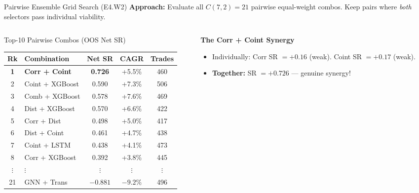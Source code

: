 \documentclass[aspectratio=169,10pt]{beamer}
\begin{document}
\begin{frame}{Pairwise Ensemble Grid Search (E4.W2)}
  \small\textbf{Approach:} Evaluate all $C(7,2)=21$ pairwise equal-weight combos. Keep pairs where \emph{both} selectors pass individual viability.
  \vspace{4pt}
  \begin{columns}[T]
    \begin{column}{0.52\textwidth}
      \begin{block}{Top-10 Pairwise Combos (OOS Net SR)}
        \centering\scriptsize\renewcommand{\arraystretch}{1.25}
        \begin{tabular}{clccc}
          \toprule
          \textbf{Rk} & \textbf{Combination} & \textbf{Net SR} & \textbf{CAGR} & \textbf{Trades} \\
          \midrule
          \rowcolor{hlrow}\textbf{1} & \textbf{Corr + Coint} & \textbf{\color{goodgreen}0.726} & +5.5\% & 460 \\
          2 & Coint + XGBoost & \color{goodgreen}0.590 & +7.3\% & 506 \\
          3 & Comb  + XGBoost & \color{goodgreen}0.578 & +7.6\% & 469 \\
          4 & Dist  + XGBoost & \color{goodgreen}0.570 & +6.6\% & 422 \\
          5 & Corr  + Dist    & \color{goodgreen}0.498 & +5.0\% & 417 \\
          6 & Dist  + Coint   & \color{goodgreen}0.461 & +4.7\% & 438 \\
          7 & Coint + LSTM    & \color{goodgreen}0.438 & +4.1\% & 473 \\
          8 & Corr  + XGBoost & \color{goodgreen}0.392 & +3.8\% & 445 \\
          $\vdots$ & $\vdots$ & $\vdots$ & $\vdots$ & $\vdots$ \\
          21 & GNN + Trans & \color{badred}$-0.881$ & $-9.2\%$ & 496 \\
          \bottomrule
        \end{tabular}
      \end{block}
    \end{column}
    \begin{column}{0.45\textwidth}
      \textbf{The Corr + Coint Synergy}
      \begin{itemize}\itemsep5pt
        \item Individually: Corr SR $= +0.16$ (weak). Coint SR $= +0.17$ (weak).
        \item \textbf{Together:} SR $= +0.726$ --- \alert{genuine synergy!}

\end{itemize}
\end{column}
\end{columns}
\end{frame}
\end{document}
